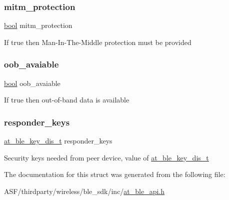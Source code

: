 \subsubsection{\texorpdfstring{mitm\_protection}{mitm\_protection}}
{\footnotesize\ttfamily \mbox{\hyperlink{group__group__sam0__utils_ga97a80ca1602ebf2303258971a2c938e2}{bool}} mitm\+\_\+protection}

If true then Man-\/\+In-\/\+The-\/\+Middle protection must be provided \mbox{\label{structat__ble__pair__features__t_a1f9c825c648822ba2a91d9d41babb46a}} 
\subsubsection{\texorpdfstring{oob\_avaiable}{oob\_avaiable}}
{\footnotesize\ttfamily \mbox{\hyperlink{group__group__sam0__utils_ga97a80ca1602ebf2303258971a2c938e2}{bool}} oob\+\_\+avaiable}

If true then out-\/of-\/band data is available \mbox{\label{structat__ble__pair__features__t_a7040db09082753ec2ba9cc272aa7505e}} 
\subsubsection{\texorpdfstring{responder\_keys}{responder\_keys}}
{\footnotesize\ttfamily \mbox{\hyperlink{at__ble__api_8h_a3406daa27ebb020343610744c1e88560}{at\+\_\+ble\+\_\+key\+\_\+dis\+\_\+t}} responder\+\_\+keys}

Security keys needed from peer device, value of \mbox{\hyperlink{at__ble__api_8h_a3406daa27ebb020343610744c1e88560}{at\+\_\+ble\+\_\+key\+\_\+dis\+\_\+t}} 

The documentation for this struct was generated from the following file\+:\begin{DoxyCompactItemize}
\item 
A\+S\+F/thirdparty/wireless/ble\+\_\+sdk/inc/\mbox{\hyperlink{at__ble__api_8h}{at\+\_\+ble\+\_\+api.\+h}}\end{DoxyCompactItemize}
